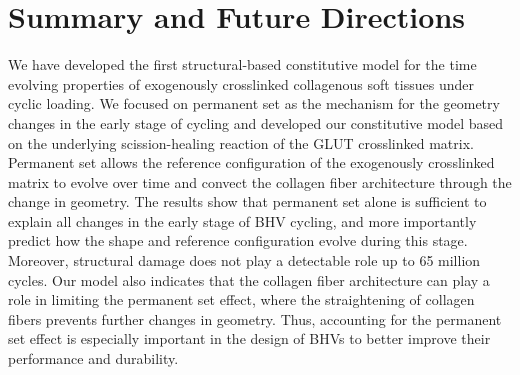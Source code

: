 

\section{Summary and Future Directions}
	We have developed the first structural-based constitutive model for the time evolving properties of exogenously crosslinked collagenous soft tissues under cyclic loading. We focused on permanent set as the mechanism for the geometry changes in the early stage of cycling and developed our constitutive model based on the underlying scission-healing reaction of the GLUT crosslinked matrix. Permanent set allows the reference configuration of the exogenously crosslinked matrix to evolve over time and convect the collagen fiber architecture through the change in geometry. The results show that permanent set alone is sufficient to explain all changes in the early stage of BHV cycling, and more importantly predict how the shape and reference configuration evolve during this stage. Moreover, structural damage does not play a detectable role up to 65 million cycles. Our model also indicates that the collagen fiber architecture can play a role in limiting the permanent set effect, where the straightening of collagen fibers prevents further changes in geometry. Thus, accounting for the permanent set effect is especially important in the design of BHVs to better improve their performance and durability. 
	
